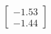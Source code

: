 \documentclass[preview]{standalone}
\begin{document}
\begin{align*}
\begin{bmatrix} -1.53 \\ -1.44 \end{bmatrix}
\end{align*}
\end{document}
